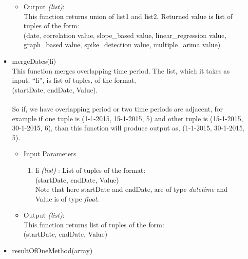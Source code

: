 \begin{itemize}
\begin{itemize}
\begin{enumerate}
 \end{enumerate}

 \item Output \textit{(list)}: \\
 This function returns union of list1 and list2. Returned value is list of 
tuples of the form: \\
 (date, correlation value, slope\_based value, linear\_regression value, 
graph\_based value, spike\_detection value, multiple\_arima value)

 \end{itemize}
 
 
 
 
  \item mergeDates(li) \\
  
  
  This function merges overlapping time period. The list, which it takes as 
input, ``li'', is list of tuples, of the format, \\
  (startDate, endDate, Value). \\
  \\
  So if, we have overlapping period or two time periods are adjacent, for 
example if one tuple is (1-1-2015, 15-1-2015, 5) and other tuple is (15-1-2015, 
30-1-2015, 6), than this function will produce output as, 
(1-1-2015, 30-1-2015, 5).
  
  \begin{itemize}
 \item Input Parameters
 
 \begin{enumerate}
  \item li \textit{(list)} : List of tuples of the format: \\
  (startDate, endDate, Value) \\
  Note that here startDate and endDate, are of type \textit{datetime} and Value 
is of type \textit{float}.
 \end{enumerate}

 \item Output \textit{(list)}: \\
 This function returns list of tuples of the form: \\
 (startDate, endDate, Value)

 \end{itemize}
  
  
  
  
 \item resultOfOneMethod(array) \\
 

\end{itemize}
